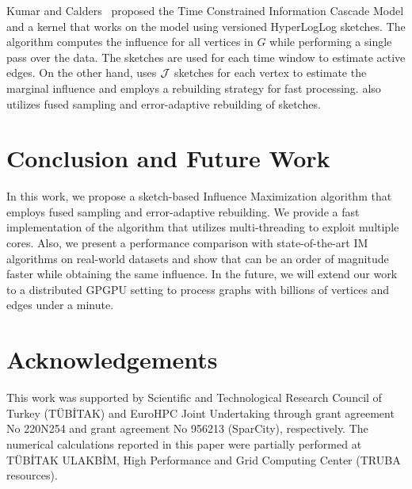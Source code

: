 Kumar and Calders~\cite{kumar2017information} proposed the Time Constrained Information Cascade Model and a kernel that works on the model using versioned HyperLogLog sketches. The algorithm computes the influence for all vertices in $G$ while performing a single pass over the data. The sketches are used for each time window to estimate active edges. On the other hand, \acro uses ${\cal J}$ sketches for each vertex to estimate the marginal influence and employs a rebuilding strategy for fast processing. \acro also utilizes fused sampling and error-adaptive rebuilding of sketches.

\section{Conclusion and Future Work}\label{sec:conclusion}

In this work, we propose a sketch-based Influence Maximization algorithm that employs fused sampling and error-adaptive rebuilding. We provide a fast implementation of the algorithm that utilizes multi-threading to exploit multiple cores. Also, we present a performance comparison with state-of-the-art IM algorithms on real-world datasets and show that \acro{} can be an order of magnitude faster while obtaining the same influence. 
In the future, we will extend our work to a distributed GPGPU setting to process graphs with billions of vertices and edges under a minute. 



\section*{Acknowledgements}

This work was supported by Scientific and Technological Research Council of Turkey (TÜBİTAK) and EuroHPC Joint Undertaking through grant agreement No 220N254 and grant agreement No 956213 (SparCity), respectively. The numerical calculations reported in this paper were partially performed at T{\"{U}}B\.{I}TAK ULAKB\.{I}M, High Performance and Grid Computing Center (TRUBA resources).

